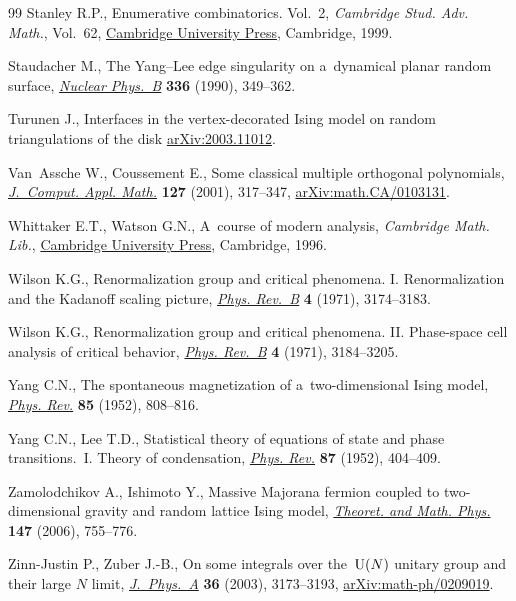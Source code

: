 \documentclass[10pt,a4paper]{amsart}
\numberwithin{equation}{section}
\begin{document}
\begin{thebibliography}{99}
Stanley R.P., Enumerative combinatorics. {V}ol.~2, \textit{Cambridge Stud. Adv.
 Math.}, Vol.~62, \href{https://doi.org/10.1017/CBO9780511609589}{Cambridge
 University Press}, Cambridge, 1999.

Staudacher M., The {Y}ang--{L}ee edge singularity on a~dynamical planar random
 surface, \href{https://doi.org/10.1016/0550-3213(90)90432-D}{\textit{Nuclear
 Phys.~B}} \textbf{336} (1990), 349--362.

Turunen J., Interfaces in the vertex-decorated Ising model on random
 triangulations of the disk
 \href{http://arxiv.org/abs/2003.11012}{arXiv:2003.11012}.

Van~Assche W., Coussement E., Some classical multiple orthogonal polynomials,
 \href{https://doi.org/10.1016/S0377-0427(00)00503-3}{\textit{J.~Comput. Appl.
 Math.}} \textbf{127} (2001), 317--347,
 \href{http://arxiv.org/abs/math.CA/0103131}{arXiv:math.CA/0103131}.

Whittaker E.T., Watson G.N., A~course of modern analysis, \textit{Cambridge Math. Lib.},
 \href{https://doi.org/10.1017/CBO9780511608759}{Cambridge University Press},
 Cambridge, 1996.

Wilson K.G., Renormalization group and critical phenomena. {I}.
 {R}enormalization and the {K}adanoff scaling picture,
 \href{https://doi.org/10.1103/PhysRevB.4.3174}{\textit{Phys. Rev.~B}}
 \textbf{4} (1971), 3174--3183.

Wilson K.G., Renormalization group and critical phenomena. {II}. Phase-space
 cell analysis of critical behavior,
 \href{https://doi.org/10.1103/PhysRevB.4.3184}{\textit{Phys. Rev.~B}}
 \textbf{4} (1971), 3184--3205.

Yang C.N., The spontaneous magnetization of a~two-dimensional {I}sing model,
 \href{https://doi.org/10.1103/PhysRev.85.808}{\textit{Phys. Rev.}}
 \textbf{85} (1952), 808--816.

Yang C.N., Lee T.D., Statistical theory of equations of state and phase
 transitions.~{I}. {T}heory of condensation,
 \href{https://doi.org/10.1103/PhysRev.87.404}{\textit{Phys. Rev.}}
 \textbf{87} (1952), 404--409.

Zamolodchikov A., Ishimoto Y., Massive {M}ajorana fermion coupled to
 two-dimensional gravity and random lattice {I}sing model,
 \href{https://doi.org/10.1007/s11232-006-0076-7}{\textit{Theoret. and Math.
 Phys.}} \textbf{147} (2006), 755--776.

Zinn-Justin P., Zuber J.-B., On some integrals over the~{${\rm U}(N)$} unitary
 group and their large {$N$} limit,
 \href{https://doi.org/10.1088/0305-4470/36/12/318}{\textit{J.~Phys.~A}}
 \textbf{36} (2003), 3173--3193,
 \href{http://arxiv.org/abs/math-ph/0209019}{arXiv:math-ph/0209019}.

\end{thebibliography}
\end{document}
